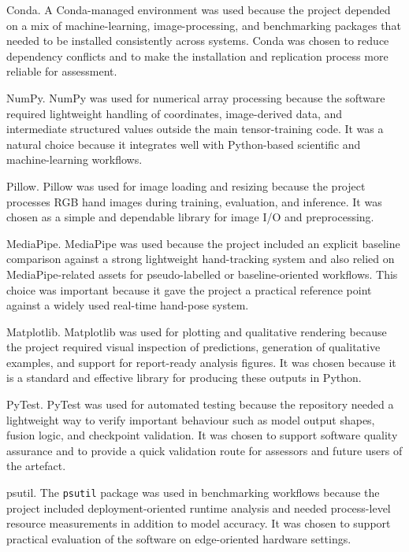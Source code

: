 ﻿\documentclass[11pt,a4paper]{article}
\begin{document}
\medskip

Conda. A Conda-managed environment was used because the project depended on a mix of machine-learning, image-processing, and benchmarking packages that needed to be installed consistently across systems. Conda was chosen to reduce dependency conflicts and to make the installation and replication process more reliable for assessment.

\medskip

NumPy. NumPy was used for numerical array processing because the software required lightweight handling of coordinates, image-derived data, and intermediate structured values outside the main tensor-training code. It was a natural choice because it integrates well with Python-based scientific and machine-learning workflows.

\medskip

Pillow. Pillow was used for image loading and resizing because the project processes RGB hand images during training, evaluation, and inference. It was chosen as a simple and dependable library for image I/O and preprocessing.

\medskip

MediaPipe. MediaPipe was used because the project included an explicit baseline comparison against a strong lightweight hand-tracking system and also relied on MediaPipe-related assets for pseudo-labelled or baseline-oriented workflows. This choice was important because it gave the project a practical reference point against a widely used real-time hand-pose system.

\medskip

Matplotlib. Matplotlib was used for plotting and qualitative rendering because the project required visual inspection of predictions, generation of qualitative examples, and support for report-ready analysis figures. It was chosen because it is a standard and effective library for producing these outputs in Python.

\medskip

PyTest. PyTest was used for automated testing because the repository needed a lightweight way to verify important behaviour such as model output shapes, fusion logic, and checkpoint validation. It was chosen to support software quality assurance and to provide a quick validation route for assessors and future users of the artefact.

\medskip

psutil. The \texttt{psutil} package was used in benchmarking workflows because the project included deployment-oriented runtime analysis and needed process-level resource measurements in addition to model accuracy. It was chosen to support practical evaluation of the software on edge-oriented hardware settings.
\end{document}
